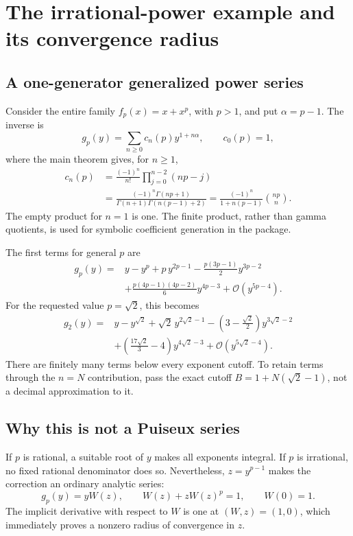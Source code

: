 \documentclass[11pt,a4paper]{article}
\newcommand{\OO}{\mathcal O}
\theoremstyle{definition}
\begin{document}
\section{The irrational-power example and its convergence radius}
\subsection{A one-generator generalized power series}
Consider the entire family
\(f_p(x)=x+x^p\), with \(p>1\), and put \(\alpha=p-1\). The inverse is
\begin{equation}\label{eq:pseries}
 g_p(y)=\sum_{n\ge0}c_n(p)y^{1+n\alpha},\qquad c_0(p)=1,
\end{equation}
where the main theorem gives, for \(n\ge1\),
\begin{align}
 c_n(p)
 &=\frac{(-1)^n}{n!}\prod_{j=0}^{n-2}(np-j)\label{eq:pcoefficient}\\
 &=\frac{(-1)^n\Gamma(np+1)}
 {\Gamma(n+1)\Gamma(n(p-1)+2)}
 =\frac{(-1)^n}{1+n(p-1)}\binom{np}{n}.\nonumber
\end{align}
The empty product for \(n=1\) is one. The finite product, rather than gamma
quotients, is used for symbolic coefficient generation in the package.

The first terms for general \(p\) are
\begin{align}\label{eq:pgeneral}
 g_p(y)={}&y-y^p+p\,y^{2p-1}
 -\frac{p(3p-1)}2y^{3p-2}\\
 &+\frac{p(4p-1)(4p-2)}6y^{4p-3}
 +\OO(y^{5p-4}).\nonumber
\end{align}
For the requested value \(p=\sqrt2\), this becomes
\begin{align}\label{eq:sqrt2}
 g_2(y)={}&y-y^{\sqrt2}+\sqrt2\,y^{2\sqrt2-1}
 -\left(3-\frac{\sqrt2}{2}\right)y^{3\sqrt2-2}\\
 &+\left(\frac{17\sqrt2}{3}-4\right)y^{4\sqrt2-3}
 +\OO(y^{5\sqrt2-4}).\nonumber
\end{align}
There are finitely many terms below every exponent cutoff. To retain terms
through the \(n=N\) contribution, pass the exact cutoff
\(B=1+N(\sqrt2-1)\), not a decimal approximation to it.

\subsection{Why this is not a Puiseux series}
If \(p\) is rational, a suitable root of \(y\) makes all exponents integral.
If \(p\) is irrational, no fixed rational denominator does so. Nevertheless,
\(z=y^{p-1}\) makes the correction an ordinary analytic series:
\[
 g_p(y)=yW(z),\qquad W(z)+zW(z)^p=1,\qquad W(0)=1.
\]
The implicit derivative with respect to \(W\) is one at \((W,z)=(1,0)\),
which immediately proves a nonzero radius of convergence in \(z\).
\end{document}
